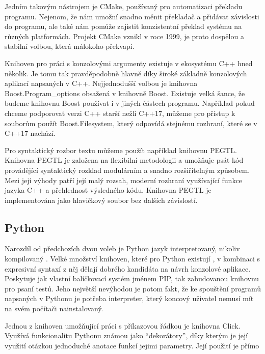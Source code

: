 Jedním takovým nástrojem je CMake, používaný pro automatizaci překladu programu. Nejenom, že nám umožní snadno měnit překladač a přidávat závislosti do programu, ale také nám pomůže zajistit konzistentní překlad systému na různých platformách\todocite. Projekt CMake vznikl v roce 1999\todocite, je proto dospělou a stabilní volbou, která málokoho překvapí.

Knihoven pro práci s konzolovými argumenty existuje v ekosystému C++ hned několik. Je tomu tak pravděpodobně hlavně díky široké základně konzolových aplikací napsaných v C++. Nejjednodušší volbou je knihovna Boost.Program\_options obsažená v knihovně Boost\cite{boost-filesystem}. Existuje velká šance, že budeme knihovnu Boost používat i v jiných částech programu. Například  pokud chceme podporovat verzi C++ starší nežli C++17\cite{cpp-filesystem}, můžeme pro přístup k souborům použít Boost.Filesystem, který odpovídá stejnému rozhraní, které se v C++17 nachází\cite{boost-filesystem}.

Pro syntaktický rozbor textu můžeme použít například knihovnu PEGTL\cite{github-pegtl}. Knihovna PEGTL je založena na flexibilní metodologii a umožňuje psát kód provádějící syntaktický rozklad modulárním a snadno rozšiřitelným způsobem. Mezi její výhody patří její malý rozsah, moderní rozhraní využívající funkce jazyka C++ a přehlednost výsledného kódu. Knihovna PEGTL je implementována jako hlavičkový soubor bez dalších závislostí\cite{github-pegtl}.


\subsection{Python}

Narozdíl od předchozích dvou voleb je Python jazyk interpretovaný, nikoliv kompilovaný . Velké množství knihoven, které pro Python existují , v kombinaci s expresivní syntaxí z něj dělají dobrého kandidáta na návrh konzolové aplikace. Poskytuje jak vlastní balíčkovací systém jménem PIP\todocite, tak zabudovanou knihovnu pro psaní testů\todocite. Jeho největší nevýhodou je potom fakt, že ke spouštění programů napsaných v Pythonu je potřeba interpreter\todocite, který koncový uživatel nemusí mít na svém počítači nainstalovaný.

Jednou z knihoven umožňující práci s příkazovou řádkou je knihovna Click\cite{website-click}. Využívá funkcionalitu Pythonu známou jako ``dekorátory'', díky kterým je její využití otázkou jednoduché anotace funkcí jejimi parametry. Její použití je přímo


